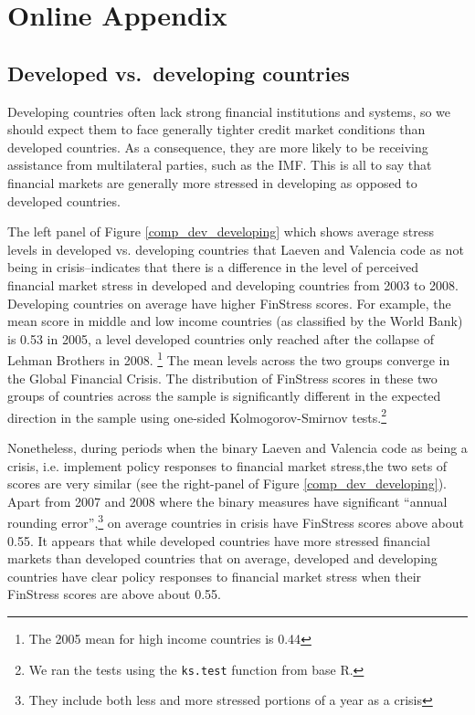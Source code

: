 \documentclass[]{article}
\begin{document}



\clearpage

\section*{Online Appendix}

\subsection*{Developed vs.~developing
countries}\label{developed-vs.developing-countries}

Developing countries often lack strong financial institutions and systems, so we should expect them to face generally tighter credit market conditions than developed countries. As a consequence, they are more likely to be receiving assistance from multilateral parties, such as the IMF. This is all to say that financial markets are generally more stressed in developing as opposed to developed countries.

The left panel of Figure \ref{comp_dev_developing} which shows average stress levels in developed vs. developing countries that Laeven and Valencia code as not being in crisis--indicates that there is a difference in the level of perceived financial market stress in developed and developing countries from 2003 to 2008. Developing countries on average have higher FinStress scores. For example, the mean score in middle and low income countries (as classified by the World Bank) is 0.53 in 2005, a level developed countries only reached after the collapse of Lehman Brothers in 2008. \footnote{The 2005 mean for high income countries is 0.44} The mean levels across the two groups converge in the Global Financial Crisis. The distribution of FinStress scores in these two groups of countries across the sample is significantly different in the expected direction in the sample using one-sided Kolmogorov-Smirnov tests.\footnote{We ran the tests using the \texttt{ks.test} function from base R.}

Nonetheless, during periods when the binary Laeven and Valencia code as being a crisis, i.e. implement policy responses to financial market stress,the two sets of scores are very similar (see the right-panel of Figure \ref{comp_dev_developing}). Apart from 2007 and 2008 where the binary measures have significant ``annual rounding error'',\footnote{They include both less and more stressed portions of a year as a crisis} on average countries in crisis have FinStress scores above about 0.55. It appears that while developed countries have more stressed financial markets than developed countries that on average, developed and developing countries have clear policy responses to financial market stress when their FinStress scores are above about 0.55.
\end{document}
